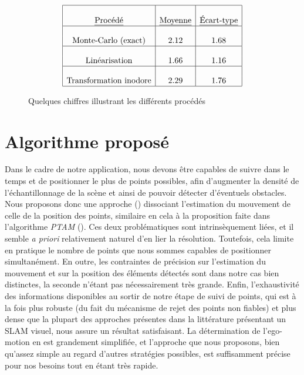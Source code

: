 \begin{figure}
	\begin{equation}
	\begin{array} {| c | c | c |}
	\hline
	& & \\
	\textnormal{\emph{Procédé}} & \textnormal{\emph{Moyenne}} &	\textnormal{\emph{Écart-type}}\\
	\hline
	& & \\
	\textnormal{Monte-Carlo	(exact)}	& 2.12  &	1.68 \\
	\hline
	& & \\
	\textnormal{Linéarisation} & 1.66	& 1.16 \\
	\hline
	& & \\
	\textnormal{Transformation inodore}	& 2.29	&	1.76 \\
	\hline
	\end{array}	
	\end{equation}
	\caption{Quelques chiffres illustrant les différents procédés}
	\label{tab:ch4_comparaisons_linéarisation}
\end{figure}


\section{Algorithme proposé}
Dans le cadre de notre application, nous devons être capables de suivre dans le temps et de positionner le plus de points possibles, afin d'augmenter la densité de l'échantillonnage de la scène et ainsi de pouvoir détecter d'éventuels obstacles. Nous proposons donc une approche (\cite{Lefaudeux2012}) dissociant l'estimation du mouvement de celle de la position des points, similaire en cela à la proposition faite dans l'algorithme \emph{PTAM} (\cite{Klein2007}). Ces deux problématiques sont intrinsèquement liées, et il semble \textit{a priori} relativement naturel d'en lier la résolution. Toutefois, cela limite en pratique le nombre de points que nous sommes capables de positionner simultanément. En outre, les contraintes de précision sur l'estimation du mouvement et sur la position des éléments détectés sont dans notre cas bien distinctes, la seconde n'étant pas nécessairement très grande. Enfin, l'exhaustivité des informations disponibles au sortir de notre étape de suivi de points, qui est à la fois plus robuste (du fait du mécanisme de rejet des points non fiables) et plus dense que la plupart des approches présentes dans la littérature présentant un SLAM visuel, nous assure un résultat satisfaisant. La détermination de l’ego-motion en est grandement simplifiée, et l'approche que nous proposons, bien qu'assez simple au regard d'autres stratégies possibles, est suffisamment précise pour nos besoins tout en étant très rapide.

